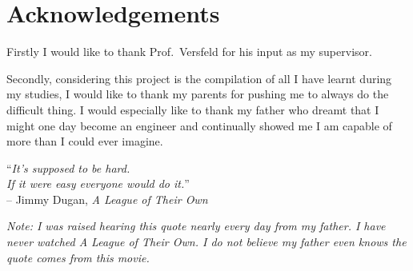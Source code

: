 \chapter*{Acknowledgements}
\makeatletter{}\makeatother
Firstly I would like to thank Prof.~Versfeld for his input as my supervisor.

Secondly, considering this project is the compilation of all I have learnt during my studies, I would like to thank my parents for pushing me to always 
do the difficult thing. I would especially like to thank my father who dreamt that I might one day become an engineer and continually showed 
me I am capable of more than I could ever imagine.

\begin{center}
{\LARGE``}\textit{It's supposed to be hard.}\\
\textit{If it were easy everyone would do it.}{\LARGE''}\\[0.5em]
-- Jimmy Dugan, \textit{A League of Their Own}

\vspace{1.5em}

\small
\textit{Note: I was raised hearing this quote nearly every day from my father. I have never watched A League of Their Own. I do not believe my father even knows the quote comes from this movie.}
\end{center}